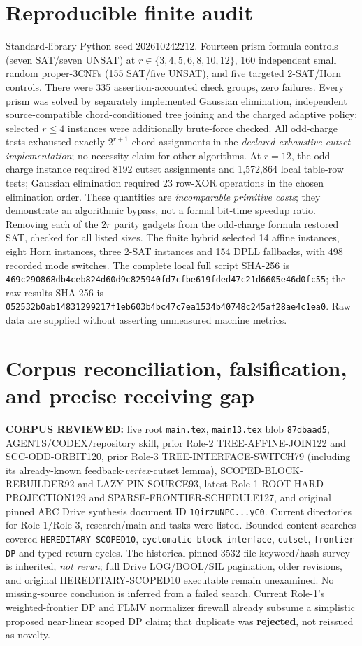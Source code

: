 \documentclass[11pt]{article}
\begin{document}
\section{Reproducible finite audit}
Standard-library Python seed 202610242212. Fourteen prism formula controls (seven SAT/seven UNSAT) at $r\in\{3,4,5,6,8,10,12\}$, 160 independent small random proper-3CNFs (155 SAT/five UNSAT), and five targeted 2-SAT/Horn controls. There were 335 assertion-accounted check groups, zero failures. Every prism was solved by separately implemented Gaussian elimination, independent source-compatible chord-conditioned tree joining and the charged adaptive policy; selected $r\le4$ instances were additionally brute-force checked. All odd-charge tests exhausted exactly $2^{r+1}$ chord assignments in the \emph{declared exhaustive cutset implementation}; no necessity claim for other algorithms. At $r=12$, the odd-charge instance required 8192 cutset assignments and 1,572,864 local table-row tests; Gaussian elimination required 23 row-XOR operations in the chosen elimination order. These quantities are \emph{incomparable primitive costs}; they demonstrate an algorithmic bypass, not a formal bit-time speedup ratio. Removing each of the $2r$ parity gadgets from the odd-charge formula restored SAT, checked for all listed sizes.
The finite hybrid selected 14 affine instances, eight Horn instances, three 2-SAT instances and 154 DPLL fallbacks, with 498 recorded mode switches. The complete local full script SHA-256 is \texttt{469c290868db4ceb824d60d9c825940fd7cfbe619fded47c21d6605e46d0fc55}; the raw-results SHA-256 is \texttt{052532b0ab14831299217f1eb603b4bc47c7ea1534b40748c245af28ae4c1ea0}. Raw data are supplied without asserting unmeasured machine metrics.

\section{Corpus reconciliation, falsification, and precise receiving gap}
\textbf{CORPUS REVIEWED:} live root \texttt{main.tex}, \texttt{main13.tex} blob \texttt{87dbaad5}, AGENTS/CODEX/repository skill, prior Role-2 TREE-AFFINE-JOIN122 and SCC-ODD-ORBIT120, prior Role-3 TREE-INTERFACE-SWITCH79 (including its already-known feedback-\emph{vertex}-cutset lemma), SCOPED-BLOCK-REBUILDER92 and LAZY-PIN-SOURCE93, latest Role-1 ROOT-HARD-PROJECTION129 and SPARSE-FRONTIER-SCHEDULE127, and original pinned ARC Drive synthesis document ID \texttt{1QirzuNPC...yC0}. Current directories for Role-1/Role-3, research/main and tasks were listed. Bounded content searches covered \texttt{HEREDITARY-SCOPED10}, \texttt{cyclomatic block interface}, \texttt{cutset}, \texttt{frontier DP} and typed return cycles. The historical pinned 3532-file keyword/hash survey is inherited, \emph{not rerun}; full Drive LOG/BOOL/SIL pagination, older revisions, and original HEREDITARY-SCOPED10 executable remain unexamined. No missing-source conclusion is inferred from a failed search. Current Role-1's weighted-frontier DP and FLMV normalizer firewall already subsume a simplistic proposed near-linear scoped DP claim; that duplicate was \textbf{rejected}, not reissued as novelty.
\end{document}
